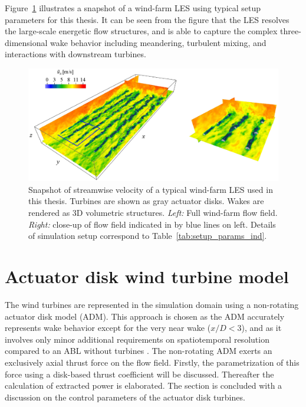 Figure~\ref{fig:les_field} illustrates a snapshot of a wind-farm LES using typical setup parameters for this thesis. It can be seen from the figure that the LES resolves the large-scale energetic flow structures, and is able to capture the complex three-dimensional wake behavior including meandering, turbulent mixing, and interactions with downstream turbines.

\begin{figure}
	\centering
	\includegraphics[width=\linewidth]{chapters/methodology/les_field.eps}
	\caption{Snapshot of streamwise velocity of a typical wind-farm LES used in this thesis. Turbines are shown as gray actuator disks. Wakes are rendered as 3D volumetric structures. \emph{Left: } Full wind-farm flow field. \emph{Right: } close-up of flow field indicated in by blue lines on left. Details of simulation setup correspond to Table~\ref{tab:setup_params_ind}. \label{fig:les_field}}
\end{figure}

\section{Actuator disk wind turbine model}\label{sec:meth_adm}
The wind turbines are represented in the simulation domain using a non-rotating actuator disk model (ADM). This approach is chosen as the ADM accurately represents wake behavior except for the very near wake ($x/D < 3$), and as it involves only minor additional requirements on spatiotemporal resolution compared to an ABL without turbines \citep{mikkelsen2003actuator, wu2015modeling}. The non-rotating ADM exerts an exclusively axial thrust force on the flow field. Firstly, the parametrization of this force using a disk-based thrust coefficient will be discussed. Thereafter the calculation of extracted power is elaborated. The section is concluded with a discussion on the control parameters of the actuator disk turbines.

